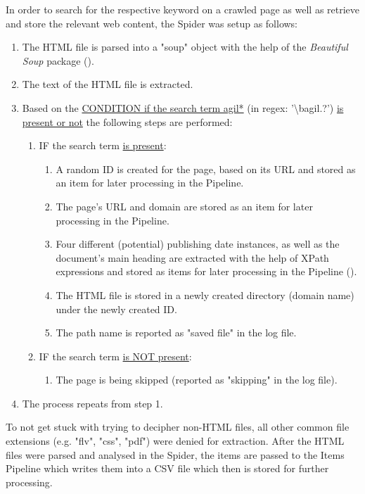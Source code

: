 \noindent
In order to search for the respective keyword on a crawled page as well as retrieve and store the relevant web content, the Spider was setup as follows:
%
\begin{enumerate}
    \setlength
    \itemsep{0em}
        \item The HTML file is parsed into a "soup" object with the help of the \textit{Beautiful Soup} package (\cite{Richardson2007}).
        \item The text of the HTML file is extracted.
        \item Based on the \underline{CONDITION if the search term agil*} (in regex: '\textbackslash bagil.?') \underline{is present or not} the following steps are performed:
        \begin{enumerate}
            \item IF the search term \underline{is present}:
            \begin{enumerate}
                \item A random ID is created for the page, based on its URL and stored as an item for later processing in the Pipeline.
                \item The page's URL and domain are stored as an item for later processing in the Pipeline.
                \item Four different (potential) publishing date instances, as well as the document's main heading are extracted with the help of XPath expressions and stored as items for later processing in the Pipeline (\cite{W3schools.com2020}).
                \item The HTML file is stored in a newly created directory (domain name) under the newly created ID.
                \item The path name is reported as "saved file" in the log file. 
            \end{enumerate}
            \item IF the search term \underline{is NOT present}:
            \begin{enumerate}
                \item The page is being skipped (reported as "skipping" in the log file).
            \end{enumerate}
        \end{enumerate}
        \item The process repeats from step 1. 
\end{enumerate}\par
\noindent
To not get stuck with trying to decipher non-HTML files, all other common file extensions (e.g. "flv", "css", "pdf") were denied for extraction. After the HTML files were parsed and analysed in the Spider, the items are passed to the Items Pipeline which writes them into a CSV file which then is stored for further processing.\par
%
